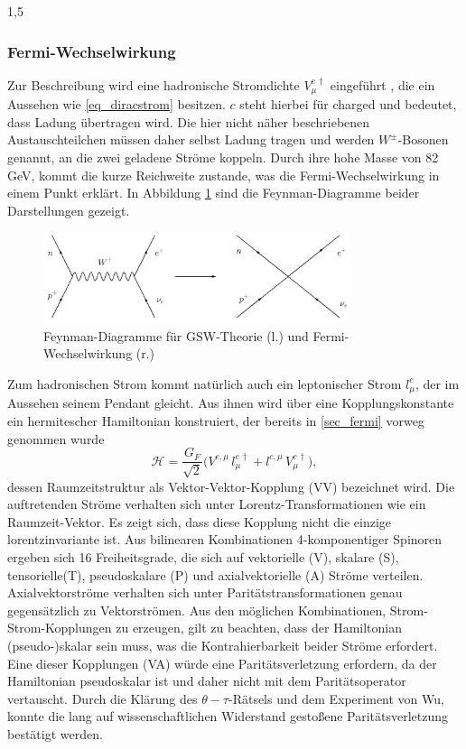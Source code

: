 \documentclass[11pt,a4paper,twoside]{report}
\begin{document}
\begin{spacing}{1,5}
\subsubsection{Fermi-Wechselwirkung}
Zur Beschreibung wird eine hadronische Stromdichte $V_\mu^{c\,\dagger}$ eingeführt \cite{Klapdor}, die ein Aussehen wie \eqref{eq_diracstrom} besitzen. 
$c$ steht hierbei für charged und bedeutet, dass Ladung
übertragen wird. Die hier nicht näher beschriebenen Austauschteilchen müssen daher selbst Ladung tragen und werden $W^\pm$-Bosonen genannt, an die zwei 
geladene Ströme koppeln. Durch ihre hohe Masse von 82 GeV, kommt die kurze Reichweite zustande, was die Fermi-Wechselwirkung in einem Punkt erklärt. In
Abbildung \ref{pic_4fermi} sind die Feynman-Diagramme beider Darstellungen gezeigt.
\begin{figure}[H]
\includegraphics[width=0.8\textwidth]{Abbildungen/4fermi.jpg}
\caption{Feynman-Diagramme für GSW-Theorie (l.) und Fermi-Wechselwirkung (r.)}
\label{pic_4fermi}
\end{figure}
Zum hadronischen Strom kommt natürlich auch ein leptonischer Strom $l_\mu^c$, der im Aussehen seinem Pendant gleicht. Aus ihnen wird über eine Kopplungskonstante
ein hermitescher Hamiltonian konstruiert, der bereits in \ref{sec_fermi} vorweg genommen wurde
\begin{equation}
 \mathcal{H} = \frac{G_F}{\sqrt{2}}\big(V^{c,\mu}\,l_\mu^{c\,\dagger} + l^{c,\mu}\,V_\mu^{c\,\dagger}\big),
\end{equation}
dessen Raumzeitstruktur als Vektor-Vektor-Kopplung (VV) bezeichnet wird. Die auftretenden Ströme verhalten sich unter Lorentz-Transformationen wie ein Raumzeit-Vektor.
Es zeigt sich, dass diese Kopplung nicht die einzige lorentzinvariante ist. Aus bilinearen Kombinationen 4-komponentiger Spinoren ergeben sich 16 Freiheitsgrade,
die sich auf vektorielle (V), skalare (S), tensorielle(T), pseudoskalare (P) und axialvektorielle (A) Ströme verteilen. Axialvektorströme verhalten sich unter
Paritätstransformationen genau gegensätzlich zu Vektorströmen. Aus den möglichen Kombinationen, Strom-Strom-Kopplungen zu erzeugen, gilt zu beachten, dass
der Hamiltonian (pseudo-)skalar sein muss, was die Kontrahierbarkeit beider Ströme erfordert. Eine dieser Kopplungen (VA) würde eine Paritätsverletzung erfordern,
da der Hamiltonian pseudoskalar ist und daher nicht mit dem Paritätsoperator vertauscht. Durch die Klärung des $\theta-\tau$-Rätsels und dem Experiment von Wu,
konnte die lang auf wissenschaftlichen Widerstand gestoßene Paritätsverletzung bestätigt werden.


\end{spacing}
\end{document}
